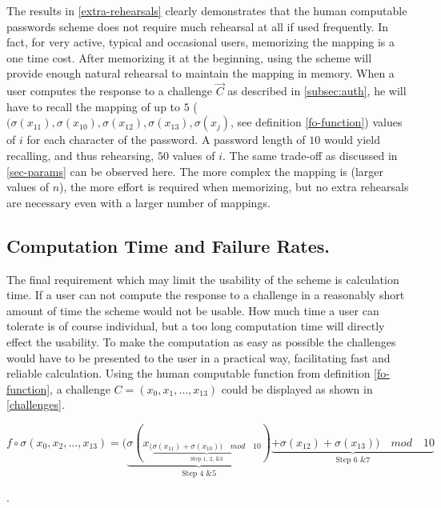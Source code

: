 \par The results in \autoref{extra-rehearsals} clearly demonstrates that the human computable passwords scheme does not require much rehearsal at all if used frequently. In fact, for very active, typical and occasional users, memorizing the mapping is a one time cost. After memorizing it at the beginning, using the scheme will provide enough natural rehearsal to maintain the mapping in memory. 
When a user computes the response to a challenge $\vec C$ as described in \autoref{subsec:auth}, he will have to recall the mapping of up to $5$ ($(\sigma(x_{11}), \sigma(x_{10}), \sigma(x_{12}), \sigma(x_{13}),\sigma(x_j)$, see definition \ref{fo-function}) values of $i$ for each character of the password. A password length of $10$ would yield recalling, and thus rehearsing, $50$ values of $i$. The same trade-off as discussed in \autoref{sec-params} can be observed here. The more complex the mapping is (larger values of $n$), the more effort is required when memorizing, but no extra rehearsals are necessary even with a larger number of mappings.

    \subsection{Computation Time and Failure Rates.}\label{computation-time}
The final requirement which may limit the usability of the scheme is calculation time. If a user can not compute the response to a challenge in a reasonably short amount of time the scheme would not be usable. How much time a user can tolerate is of course individual, but a too long computation time will directly effect the usability. To make the computation as easy as possible the challenges would have to be presented to the user in a practical way, facilitating fast and reliable calculation. Using the human computable function from definition \ref{fo-function}, a challenge $C = (x_0, x_1,\dots, x_{13})$ could be displayed as shown in \autoref{challenges}. \\ 
\centerline{ $f\circ \sigma(x_0,x_2,\dots,x_{13}) = \big(\underbrace{\sigma ( x_{ (\underbrace{\sigma(x_{11}) + \sigma(x_{10}) )\quad mod \quad 10}_\text{Step 1, 2, \& 3}} )}_\text{Step 4 \& 5} \underbrace{ +\sigma ( x_{12} ) + \sigma( x_{13} )\big)\quad mod \quad 10 }_\text{Step 6 \& 7}$ }. 

